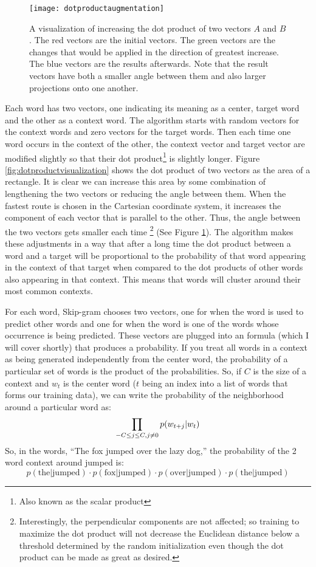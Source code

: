 \begin{figure}[tbp]
  \texttt{[image: dotproductaugmentation]}
  \caption{A visualization of increasing the dot product of two vectors $A$ and 
  $B$. The red vectors are the initial vectors. The green vectors are the 
  changes that would be applied in the direction of greatest increase. The blue
  vectors are the results afterwards. Note that the result vectors have both a 
  smaller angle between them and also larger projections onto one another.}
  \label{fig:dotproductaugmentation}
\end{figure}

Each word has two vectors, one indicating its meaning as a center, target word 
and the other as a context word. The algorithm starts with random vectors for 
the context words and zero vectors for the target words. Then 
each time one word occurs in the context of the other, the context vector and 
target vector are modified slightly so that their dot product\footnote{Also 
known as the scalar product} is slightly longer. Figure 
\ref{fig:dotproductvisualization} shows the dot product of two vectors as the 
area of a rectangle. It is clear we can increase this area by some combination 
of lengthening the two vectors or reducing the angle between them. 
When the fastest route is chosen in the Cartesian coordinate system, it
increases the component of each vector that is parallel to the other. Thus, the
angle between the two vectors gets smaller each time
\footnote{Interestingly, the perpendicular components are not affected; so 
training to maximize the dot product will not decrease the Euclidean distance
below a threshold determined by the random initialization even though the
dot product can be made as great as desired.} (See Figure 
\ref{fig:dotproductaugmentation}).
The algorithm 
makes these adjustments in a way that after a long time the dot product
between a word and a target will be proportional to the probability of that word 
appearing in the context of that target when compared to the dot products of
other words also appearing in that context. This means that words will cluster
around their most common contexts.


For each word, Skip-gram chooses two vectors, one for when the word is used to
predict other words and one for when the word is one of the words whose
occurrence is being predicted. These vectors are plugged into an formula (which
I will cover shortly) that produces a probability. If you treat all words in a
context as being generated independently from the center word, the probability
of a particular set of words is the product of the probabilities. So, if $C$ is
the size of a context and $w_t$ is the center word ($t$ being an index into a
list of words that forms our training data), we can write the probability of
the neighborhood around a particular word as:
%
\[\prod_{-C \le j \le C, \\ j \ne 0 } p(w_{t+j}|w_t)\]
%
So, in the words, ``The fox jumped over the lazy dog,'' the 
probability of the 2 word context around jumped is:
%
\[p(\text{the|jumped})\cdot{}p(\text{fox|jumped})\cdot{}p(\text{over|jumped})\cdot{}p(\text{the|jumped})\]

